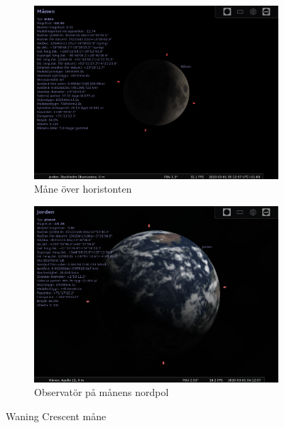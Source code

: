 \documentclass[./exercises.tex]{subfiles}
\begin{document}
\begin{itemize}
\begin{figure}[H]
     \hfill
     \begin{subfigure}[b]{0.45\textwidth}
         \centering
         \includegraphics[width=\textwidth]{Stellarium1/WaningCrescent/stellarium-003.png}
         \caption{Måne över horistonten}
         \label{fig:three sin x}
     \end{subfigure}
     \hfill
     \begin{subfigure}[b]{0.45\textwidth}
         \centering
         \includegraphics[width=\textwidth]{Stellarium1/WaningCrescent/stellarium-004.png}
         \caption{Observatör på månens nordpol}
         \label{fig:three sin x}
     \end{subfigure}
     \hfill
        \caption{ Waning Crescent måne}
        \label{fig:perod graphs}
\end{figure}

\end{itemize}
\end{document}
